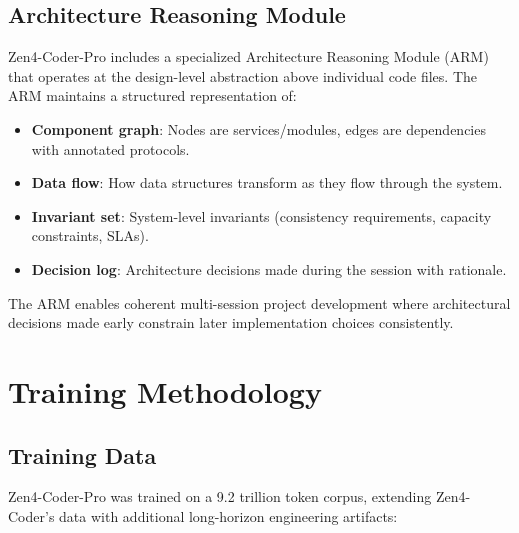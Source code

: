 \documentclass[11pt,a4paper]{article}
\begin{document}
\subsection{Architecture Reasoning Module}

Zen4-Coder-Pro includes a specialized Architecture Reasoning Module (ARM) that operates at the design-level abstraction above individual code files. The ARM maintains a structured representation of:

\begin{itemize}
  \item \textbf{Component graph}: Nodes are services/modules, edges are dependencies with annotated protocols.
  \item \textbf{Data flow}: How data structures transform as they flow through the system.
  \item \textbf{Invariant set}: System-level invariants (consistency requirements, capacity constraints, SLAs).
  \item \textbf{Decision log}: Architecture decisions made during the session with rationale.
\end{itemize}

The ARM enables coherent multi-session project development where architectural decisions made early constrain later implementation choices consistently.

\section{Training Methodology}

\subsection{Training Data}

Zen4-Coder-Pro was trained on a 9.2 trillion token corpus, extending Zen4-Coder's data with additional long-horizon engineering artifacts:
\end{document}
